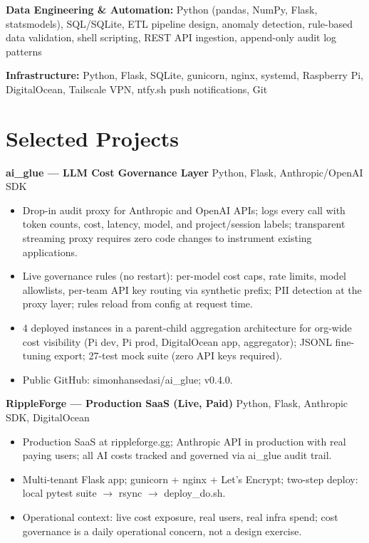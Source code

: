 \documentclass[11pt,a4paper]{article}
\begin{document}
\noindent
\textbf{Data Engineering \& Automation:} Python (pandas, NumPy, Flask, statsmodels), SQL/SQLite, ETL pipeline design, anomaly detection, rule-based data validation, shell scripting, REST API ingestion, append-only audit log patterns

\noindent
\textbf{Infrastructure:} Python, Flask, SQLite, gunicorn, nginx, systemd, Raspberry Pi, DigitalOcean, Tailscale VPN, ntfy.sh push notifications, Git

\section*{Selected Projects}

\noindent
\textbf{ai\_glue --- LLM Cost Governance Layer} \hfill Python, Flask, Anthropic/OpenAI SDK
\begin{itemize}
    \item Drop-in audit proxy for Anthropic and OpenAI APIs; logs every call with token counts, cost, latency, model, and project/session labels; transparent streaming proxy requires zero code changes to instrument existing applications.
    \item Live governance rules (no restart): per-model cost caps, rate limits, model allowlists, per-team API key routing via synthetic prefix; PII detection at the proxy layer; rules reload from config at request time.
    \item 4 deployed instances in a parent-child aggregation architecture for org-wide cost visibility (Pi dev, Pi prod, DigitalOcean app, aggregator); JSONL fine-tuning export; 27-test mock suite (zero API keys required).
    \item Public GitHub: simonhansedasi/ai\_glue; v0.4.0.
\end{itemize}

\vspace{0.2cm}
\noindent
\textbf{RippleForge --- Production SaaS (Live, Paid)} \hfill Python, Flask, Anthropic SDK, DigitalOcean
\begin{itemize}
    \item Production SaaS at rippleforge.gg; Anthropic API in production with real paying users; all AI costs tracked and governed via ai\_glue audit trail.
    \item Multi-tenant Flask app; gunicorn + nginx + Let's Encrypt; two-step deploy: local pytest suite $\rightarrow$ rsync $\rightarrow$ deploy\_do.sh.
    \item Operational context: live cost exposure, real users, real infra spend; cost governance is a daily operational concern, not a design exercise.
\end{itemize}
\end{document}
